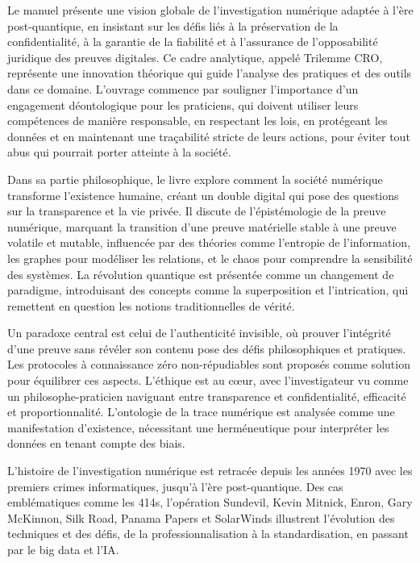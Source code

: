 \documentclass[a4paper,12pt]{extarticle}
\begin{document}
Le manuel présente une vision globale de l'investigation numérique adaptée à l'ère post-quantique, en insistant sur les défis liés à la préservation de la confidentialité, à la garantie de la fiabilité et à l'assurance de l'opposabilité juridique des preuves digitales. Ce cadre analytique, appelé Trilemme CRO, représente une innovation théorique qui guide l'analyse des pratiques et des outils dans ce domaine. L'ouvrage commence par souligner l'importance d'un engagement déontologique pour les praticiens, qui doivent utiliser leurs compétences de manière responsable, en respectant les lois, en protégeant les données et en maintenant une traçabilité stricte de leurs actions, pour éviter tout abus qui pourrait porter atteinte à la société.

Dans sa partie philosophique, le livre explore comment la société numérique transforme l'existence humaine, créant un double digital qui pose des questions sur la transparence et la vie privée. Il discute de l'épistémologie de la preuve numérique, marquant la transition d'une preuve matérielle stable à une preuve volatile et mutable, influencée par des théories comme l'entropie de l'information, les graphes pour modéliser les relations, et le chaos pour comprendre la sensibilité des systèmes. La révolution quantique est présentée comme un changement de paradigme, introduisant des concepts comme la superposition et l'intrication, qui remettent en question les notions traditionnelles de vérité.

Un paradoxe central est celui de l'authenticité invisible, où prouver l'intégrité d'une preuve sans révéler son contenu pose des défis philosophiques et pratiques. Les protocoles à connaissance zéro non-répudiables sont proposés comme solution pour équilibrer ces aspects. L'éthique est au cœur, avec l'investigateur vu comme un philosophe-praticien naviguant entre transparence et confidentialité, efficacité et proportionnalité. L'ontologie de la trace numérique est analysée comme une manifestation d'existence, nécessitant une herméneutique pour interpréter les données en tenant compte des biais.

L'histoire de l'investigation numérique est retracée depuis les années 1970 avec les premiers crimes informatiques, jusqu'à l'ère post-quantique. Des cas emblématiques comme les 414s, l'opération Sundevil, Kevin Mitnick, Enron, Gary McKinnon, Silk Road, Panama Papers et SolarWinds illustrent l'évolution des techniques et des défis, de la professionnalisation à la standardisation, en passant par le big data et l'IA.
\end{document}
